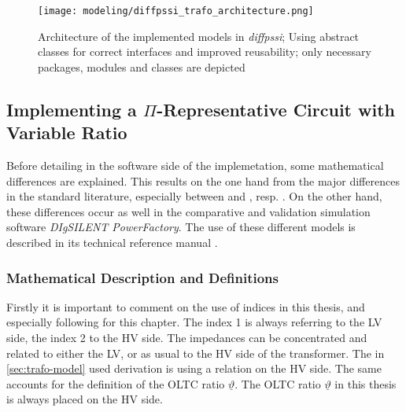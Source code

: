 \begin{figure}[htbp!]
        \centering
        \texttt{[image: modeling/diffpssi\_trafo\_architecture.png]}
        \caption[Architecture of the implemented models in \textit{diffpssi}]{Architecture of the implemented models in \textit{diffpssi}; Using abstract classes for correct interfaces and improved reusability; only necessary packages, modules and classes are depicted}
        \label{fig:transformer-architecture}
\end{figure}

\subsection{Implementing a $\Pi$-Representative Circuit with Variable Ratio}

Before detailing in the software side of the implemetation, some mathematical differences are explained.
This results on the one hand from the major differences in the standard literature, especially between \textcite{machowski_2020} and \textcite{kundur_2022}, resp. \textcite{milano_2010}.
On the other hand, these differences occur as well in the comparative and validation simulation software \textit{DIgSILENT PowerFactory}.
The use of these different models is described in its technical reference manual \quelle. 

\subsubsection{Mathematical Description and Definitions}

Firstly it is important to comment on the use of indices in this thesis, and especially following for this chapter.
The index 1 is always referring to the \acs{LV} side, the index 2 to the \acs{HV} side. 
The impedances can be concentrated and related to either the \acs{LV}, or as usual to the \acs{HV} side of the transformer. 
The in \autoref{sec:trafo-model} used derivation is using a relation on the \acs{HV} side.
The same accounts for the definition of the \acs{OLTC} ratio $\underline{\vartheta}$.     
The \acs{OLTC} ratio $\underline{\vartheta}$ in this thesis is always placed on the HV side.

